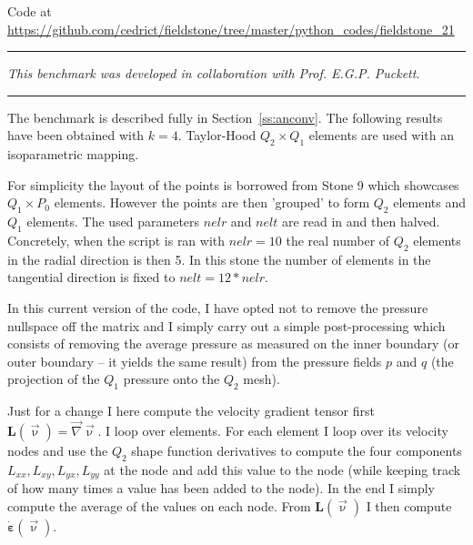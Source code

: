 

\begin{center}
Code at \url{https://github.com/cedrict/fieldstone/tree/master/python_codes/fieldstone_21}
\end{center}

\par\noindent\rule{\textwidth}{0.4pt}

{\sl This benchmark was developed in collaboration with Prof. E.G.P. Puckett}. 

\par\noindent\rule{\textwidth}{0.4pt}

The benchmark is described fully in Section~\ref{ss:anconv}. 
The following results have been obtained with $k=4$.
Taylor-Hood $Q_2\times Q_1$ elements are used with an isoparametric mapping. 

For simplicity the layout of the points is borrowed from Stone 9 which 
showcases $Q_1 \times P_0$ elements. However the points are then 'grouped' 
to form $Q_2$ elements and $Q_1$ elements. 
The used parameters $nelr$ and $nelt$ are read in and then halved. Concretely, 
when the script is ran with $nelr=10$ the real number of $Q_2$ elements 
in the radial direction is then 5. In this stone the number of elements
in the tangential direction is fixed to $nelt=12*nelr$.

In this current version of the code, I have opted not to remove the pressure nullspace
off the matrix and I simply carry out a simple post-processing which consists of 
removing the average pressure as measured on the inner boundary (or outer boundary -- it 
yields the same result) from the pressure fields $p$ and $q$ (the projection of the 
$Q_1$ pressure onto the $Q_2$ mesh). 

Just for a change I here compute the velocity gradient tensor first ${\bm L}(\vec\upnu)=\vec\nabla\vec\upnu$.
I loop over elements. For each element I loop over its velocity nodes and use the $Q_2$ 
shape function derivatives to compute the four components $L_{xx},L_{xy},L_{yx},L_{yy}$ at 
the node and add this value to the node (while keeping track of how many times a value
has been added to the node). In the end I simply compute the average of the values
on each node. From ${\bm L}(\vec\upnu)$ I then compute $\dot{\bm \varepsilon}(\vec\upnu)$. 

